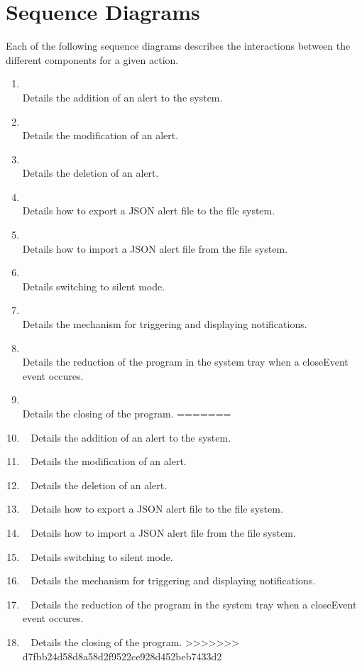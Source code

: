 \chapter{Sequence Diagrams}\label{ch:sequence_diagrams}
Each of the following sequence diagrams describes the interactions between the different components for a given action.\\
\begin{enumerate}
<<<<<<< HEAD
    \item~\\Details the addition of an alert to the system.
    \item~\\Details the modification of an alert.
    \item~\\Details the deletion of an alert.
    \item~\\Details how to export a JSON alert file to the file system.
    \item~\\Details how to import a JSON alert file from the file system.
    \item~\\Details switching to silent mode.
    \item~\\Details the mechanism for triggering and displaying notifications.
    \item~\\Details the reduction of the program in the system tray when a closeEvent event occures.
    \item~\\Details the closing of the program.
=======
    \item~ Details the addition of an alert to the system.
    \item~ Details the modification of an alert.
    \item~ Details the deletion of an alert.
    \item~ Details how to export a JSON alert file to the file system.
    \item~ Details how to import a JSON alert file from the file system.
    \item~ Details switching to silent mode.
    \item~ Details the mechanism for triggering and displaying notifications.
    \item~ Details the reduction of the program in the system tray when a closeEvent event occures.
    \item~ Details the closing of the program.
>>>>>>> d7fbb24d58d8a58d2f9522ce928d452beb7433d2
\end{enumerate}

